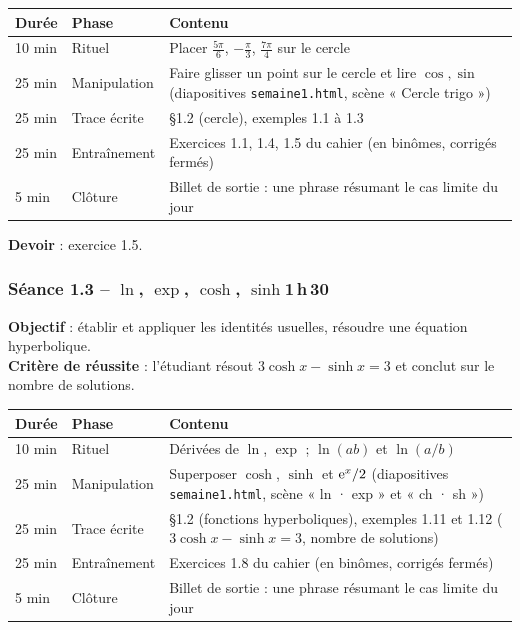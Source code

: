 \documentclass[10.5pt,a4paper]{article}
\newif\ifprof
\newcommand{\profonly}[1]{\ifprof #1\fi}
\begin{document}
\begin{longtable}{@{}p{1.1cm}p{2.4cm}p{12.4cm}@{}}
\toprule \textbf{Durée} & \textbf{Phase} & \textbf{Contenu}\\ \midrule\endhead
10 min & Rituel & Placer $\frac{5\pi}6$, $-\frac\pi3$, $\frac{7\pi}4$ sur le cercle\\
25 min & Manipulation & Faire glisser un point sur le cercle et lire $\cos,\sin$ (diapositives \texttt{semaine1.html}, scène « Cercle trigo »)\\
25 min & Trace écrite & \S1.2 (cercle), exemples 1.1 à 1.3\\
25 min & Entraînement & Exercices 1.1, 1.4, 1.5 du cahier (en binômes, corrigés fermés)\\
5 min & Clôture & Billet de sortie : une phrase résumant le cas limite du jour\\ \bottomrule\end{longtable}\nopagebreak
\textbf{Devoir} : exercice 1.5.\profonly{ \textbf{Point de vigilance} : Un seul angle trouvé sur deux : vérifier le nombre de solutions attendues avant de conclure.}\par
{}\subsubsection*{\textcolor{marine}{Séance 1.3 -- $\ln$, $\exp$, $\cosh$, $\sinh$}\hfill\normalfont\small\textcolor{ardoise}{1\,h\,30}}
\begin{objectif}\textbf{Objectif} : établir et appliquer les identités usuelles, résoudre une équation hyperbolique.\\\textbf{Critère de réussite} : l'étudiant résout $3\cosh x-\sinh x=3$ et conclut sur le nombre de solutions.\end{objectif}\nopagebreak
\begin{longtable}{@{}p{1.1cm}p{2.4cm}p{12.4cm}@{}}
\toprule \textbf{Durée} & \textbf{Phase} & \textbf{Contenu}\\ \midrule\endhead
10 min & Rituel & Dérivées de $\ln$, $\exp$ ; $\ln(ab)$ et $\ln(a/b)$\\
25 min & Manipulation & Superposer $\cosh$, $\sinh$ et $\mathrm{e}^{x}/2$ (diapositives \texttt{semaine1.html}, scène « ln · exp » et « ch · sh »)\\
25 min & Trace écrite & \S1.2 (fonctions hyperboliques), exemples 1.11 et 1.12 ($3\cosh x-\sinh x=3$, nombre de solutions)\\
25 min & Entraînement & Exercices 1.8 du cahier (en binômes, corrigés fermés)\\
5 min & Clôture & Billet de sortie : une phrase résumant le cas limite du jour\\ \bottomrule\end{longtable}\nopagebreak
\end{document}

